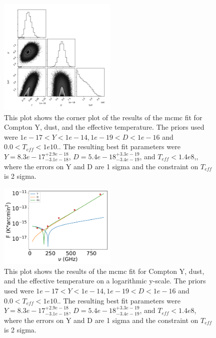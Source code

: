 \documentclass{princeton_astro_thesis}
\begin{document}
\begin{figure}[h]
\centering
\includegraphics[width=0.5\textwidth]{../redmapper_CornerTeffplot.pdf}
\caption{This plot shows the corner plot of the results of the mcmc fit for Compton Y, dust, and the effective temperature. The priors used were $ 1e-17 < Y < 1e-14, 1e-19< D < 1e-16$ and $0.0 < T_{eff} <1e10.$. The resulting best fit parameters were $Y=8.3e-17^{+2.9e-18}_{-3.1e-18}$, $D=5.4e-18^{+3.3e-19}_{-3.4e-19}$, and $T_{eff}<1.4e8$,, where the errors on Y and D are 1 sigma and the constraint on $T_{eff}$ is 2 sigma.}
\end{figure}

\begin{figure}[h]
\centering
\includegraphics[width=0.5\textwidth]{../redmapper_apfluxes_Tefffitlog.pdf}
\caption{This plot shows  the results of the mcmc fit for Compton Y, dust, and the effective temperature on a logarithmic y-scale. The priors used were $ 1e-17 < Y < 1e-14, 1e-19< D < 1e-16$ and $0.0 < T_{eff} <1e10.$. The resulting best fit parameters were $Y=8.3e-17^{+2.9e-18}_{-3.1e-18}$, $D=5.4e-18^{+3.3e-19}_{-3.4e-19}$, and $T_{eff}<1.4e8$, where the errors on Y and D are 1 sigma and the constraint on $T_{eff}$ is 2 sigma.}
\end{figure}
\end{document}
